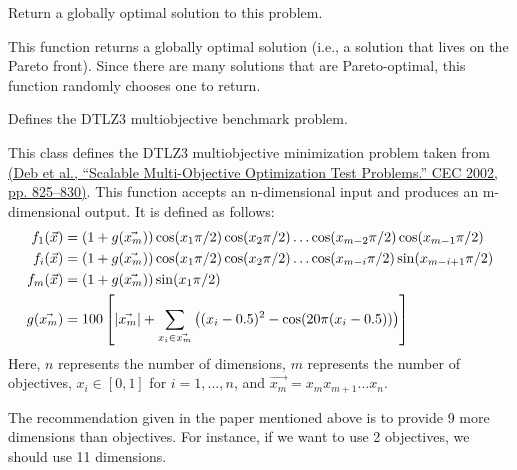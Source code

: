 \documentclass[letterpaper,10pt,english]{sphinxmanual}
\begin{document}
\begin{fulllineitems}
\begin{fulllineitems}
\label{reference:inspyred.benchmarks.DTLZ2.global_optimum}
Return a globally optimal solution to this problem.

This function returns a globally optimal solution (i.e., a 
solution that lives on the Pareto front). Since there are many
solutions that are Pareto-optimal, this function randomly 
chooses one to return.

\end{fulllineitems}


\end{fulllineitems}


\begin{fulllineitems}
\label{reference:inspyred.benchmarks.DTLZ3}
Defines the DTLZ3 multiobjective benchmark problem.

This class defines the DTLZ3 multiobjective minimization problem
taken from \href{http://www.tik.ee.ethz.ch/sop/download/supplementary/testproblems/dtlz1/index.php}{(Deb et al., ``Scalable Multi-Objective Optimization Test Problems.''
CEC 2002, pp. 825--830)}.
This function accepts an n-dimensional input and produces an m-dimensional output.
It is defined as follows:
\begin{gather}
\begin{split}f_1(\vec{x}) &= (1 + g(\vec{x_m}))\cos(x_1 \pi/2)\cos(x_2 \pi/2)\dots\cos(x_{m-2} \pi/2)\cos(x_{m-1} \pi/2) \\
f_i(\vec{x}) &= (1 + g(\vec{x_m}))\cos(x_1 \pi/2)\cos(x_2 \pi/2)\dots\cos(x_{m-i} \pi/2)\sin(x_{m-i+1} \pi/2) \\
f_m(\vec{x}) &= (1 + g(\vec{x_m}))\sin(x_1 \pi/2) \\
g(\vec{x_m}) &= 100\left[|\vec{x_m}| + \sum_{x_i \in \vec{x_m}}\left((x_i - 0.5)^2 - \cos(20\pi(x_i - 0.5))\right)\right] \\\end{split}\notag
\end{gather}
Here, $n$ represents the number of dimensions, $m$ represents the
number of objectives, $x_i \in [0, 1]$ for $i=1,...,n$, and 
$\vec{x_m} = x_m x_{m+1} \dots x_{n}.$

The recommendation given in the paper mentioned above is to provide 9 more
dimensions than objectives. For instance, if we want to use 2 objectives, we
should use 11 dimensions.


\end{fulllineitems}
\end{document}
